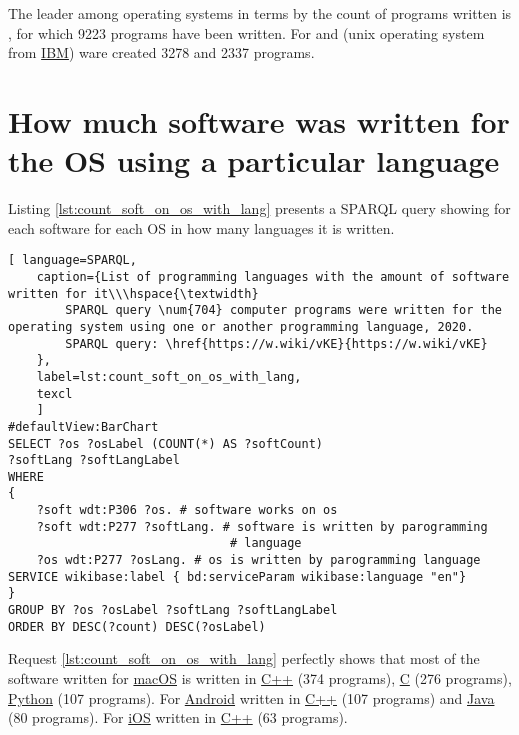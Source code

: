 The leader among operating systems in terms by the count of programs written is , for which \num{9223} programs have been written. For   and   (unix operating system from \href{https://www.wikidata.org/wiki/Q37156}{IBM}) ware created  \num{3278} and \num{2337} programs.

\section{How much software was written for the OS using a particular language}
Listing \ref{lst:count_soft_on_os_with_lang} presents a SPARQL query showing for each software for each OS in how many languages it is written.

\begin{lstlisting}[ language=SPARQL, 
	caption={List of programming languages with the amount of software written for it\\\hspace{\textwidth}
		SPARQL query \num{704} computer programs were written for the operating system using one or another programming language, 2020.
		SPARQL query: \href{https://w.wiki/vKE}{https://w.wiki/vKE}
	},
	label=lst:count_soft_on_os_with_lang,
	texcl 
	]
#defaultView:BarChart
SELECT ?os ?osLabel (COUNT(*) AS ?softCount) 
?softLang ?softLangLabel
WHERE
{
	?soft wdt:P306 ?os. # software works on os
	?soft wdt:P277 ?softLang. # software is written by parogramming
	                           # language
	?os wdt:P277 ?osLang. # os is written by parogramming language
SERVICE wikibase:label { bd:serviceParam wikibase:language "en"}
}
GROUP BY ?os ?osLabel ?softLang ?softLangLabel
ORDER BY DESC(?count) DESC(?osLabel)
\end{lstlisting}

Request \ref{lst:count_soft_on_os_with_lang} perfectly shows that most of the software written for \href{https://www.wikidata.org/wiki/Q14116}{macOS} is written in \href{https://www.wikidata.org/wiki/Q2407}{C++} (374 programs), \href{https://www.wikidata.org/wiki/Q15777}{C} (276 programs), \href{https://www.wikidata.org/wiki/Q28865}{Python} (107 programs).
For \href{https://www.wikidata.org/wiki/Q94}{Android} written in \href{https://www.wikidata.org/wiki/Q2407}{C++} (107 programs) and \href{https://www.wikidata.org/wiki/Q251}{Java} (80 programs).
For \href{https://www.wikidata.org/wiki/Q48493}{iOS} written in \href{https://www.wikidata.org/wiki/Q2407}{C++} (63 programs).


